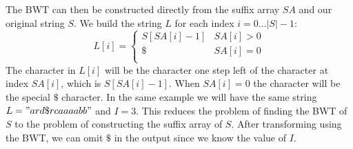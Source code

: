 \documentclass{article}
\begin{document}
The BWT can then be constructed directly from the suffix array \(SA\) and our original string \(S\). We build the string \(L\) for each index \(i = 0 \dots |S|-1\):
\[
    L[i] = \begin{cases} 
        S[SA[i] - 1] & SA[i] > 0 \\
        \$ & SA[i] = 0 \\
   \end{cases}
\]
The character in \(L[i]\) will be the character one step left of the character at index \(SA[i]\), which is \(S[SA[i] - 1]\). When \(SA[i] = 0\) the character will be the special \(\$\) character. In the same example we will have the same string \(L = "ard\$rcaaaabb"\) and \(I = 3\).
This reduces the problem of finding the BWT of \(S\) to the problem of constructing the suffix array of \(S\). After transforming using the BWT, we can omit \(\$\) in the output since we know the value of \(I\).
\end{document}

